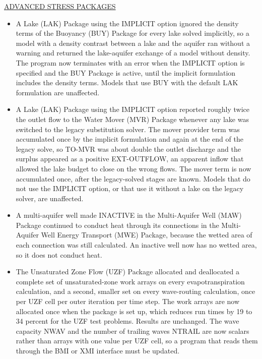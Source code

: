 \underline{ADVANCED STRESS PACKAGES}
\begin{itemize}
\item A Lake (LAK) Package using the IMPLICIT option ignored the density terms of the Buoyancy (BUY) Package for every lake solved implicitly, so a model with a density contrast between a lake and the aquifer ran without a warning and returned the lake-aquifer exchange of a model without density. The program now terminates with an error when the IMPLICIT option is specified and the BUY Package is active, until the implicit formulation includes the density terms. Models that use BUY with the default LAK formulation are unaffected.
\item A Lake (LAK) Package using the IMPLICIT option reported roughly twice the outlet flow to the Water Mover (MVR) Package whenever any lake was switched to the legacy substitution solver. The mover provider term was accumulated once by the implicit formulation and again at the end of the legacy solve, so TO-MVR was about double the outlet discharge and the surplus appeared as a positive EXT-OUTFLOW, an apparent inflow that allowed the lake budget to close on the wrong flows. The mover term is now accumulated once, after the legacy-solved stages are known. Models that do not use the IMPLICIT option, or that use it without a lake on the legacy solver, are unaffected.
\item A multi-aquifer well made INACTIVE in the Multi-Aquifer Well (MAW) Package continued to conduct heat through its connections in the Multi-Aquifer Well Energy Transport (MWE) Package, because the wetted area of each connection was still calculated. An inactive well now has no wetted area, so it does not conduct heat.
\item The Unsaturated Zone Flow (UZF) Package allocated and deallocated a complete set of unsaturated-zone work arrays on every evapotranspiration calculation, and a second, smaller set on every wave-routing calculation, once per UZF cell per outer iteration per time step. The work arrays are now allocated once when the package is set up, which reduces run times by 19 to 34 percent for the UZF test problems. Results are unchanged. The wave capacity NWAV and the number of trailing waves NTRAIL are now scalars rather than arrays with one value per UZF cell, so a program that reads them through the BMI or XMI interface must be updated.
\end{itemize}

